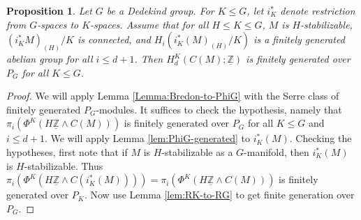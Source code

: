 \documentclass[11pt]{amsart}
\makeatletter
\newtheorem{lemma}[equation]{Lemma}
\newtheorem{proposition}[equation]{Proposition}
\theoremstyle{definition}
\numberwithin{equation}{subsection} %
\newcommand{\sm}{\wedge}
\newcommand{\Z}{\mathbb{Z}}
\newcommand{\switchmargin}{
\if@reversemargin
\normalmarginpar
\else
\reversemarginpar
\fi
}
\newcommand{\EvaNote}[1]
   {\marginpar{\raggedright\smaller \smaller \color{teal}#1}\switchmargin}
\makeatother
\begin{document}
\begin{proposition}\label{Prop:BredonHomStab}
Let $G$ be a Dedekind group. For $K\leq G$, let $i_K^*$ denote restriction from
$G$-spaces to $K$-spaces.
Assume that for all $H\leq K \leq G$, $M$ is
$H$-stabilizable, $(i_K^*M)_{(H)}/K$ is connected,
and $H_i(i_K^*(M)_{(H)}/K)$ is a finitely generated abelian group for all $i\leq d+1$.
Then $H_d^K(C(M);\underline{\Z})$ is finitely generated over $P_G$ for all $K\leq G$.
\end{proposition}
\begin{proof}
We will apply Lemma \ref{Lemma:Bredon-to-PhiG} with the Serre class of finitely generated $P_G$-modules. It suffices to check the hypothesis, namely that $\pi_i(\Phi^K(H\underline{\Z}\sm C(M)))$ is finitely generated over $P_G$ for all $K\leq G$ and $i\leq d+1$. 
We will apply Lemma \ref{lem:PhiG-generated} to $i^*_K(M)$. Checking the
hypotheses, first note that if $M$ is $H$-stabilizable as a $G$-manifold, then
$i^*_K(M)$ is $H$-stabilizable.
Thus $\pi_i(\Phi^K(H\underline{\Z}\sm C(i^*_K(M))))=\pi_i(\Phi^K(H\underline{\Z}\sm C(M)))$ is finitely generated over $P_K$. Now use Lemma \ref{lem:RK-to-RG} to get finite generation over $P_G$.
\end{proof}


\end{document}
